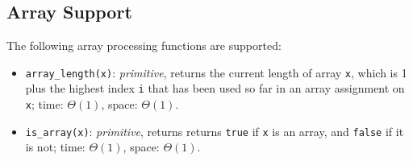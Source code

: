 \subsection*{Array Support}

The following array processing functions are supported:

\begin{itemize}
\item \lstinline{array_length(x)}: \textit{primitive}, returns
  the current length of array \lstinline{x}, which is 1 plus the
highest index \lstinline{i} that has been used so far in an array assignment on \lstinline{x}; time: $\Theta(1)$, space: $\Theta(1)$.
\item \lstinline{is_array(x)}: \textit{primitive}, returns
  returns \texttt{true} if \texttt{x} is an array, and \texttt{false} if it is not;
  time: $\Theta(1)$, space: $\Theta(1)$.
\end{itemize}

  



